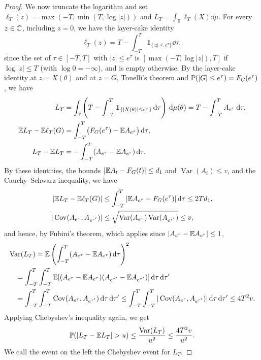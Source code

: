 \begin{proof}
We now truncate the logarithm and set
$\ell_T(z)=\max(-T,\min(T,\log|z|))$ and
$L_T=\int_{\mathbb T}\ell_T(X)\dd\mu$.
For every $z\in\mathbb C$, including $z=0$, we have the layer-cake identity
\[
 \ell_T(z)=T-\int_{-T}^T\boldsymbol1_{\{|z|\leq e^\tau\}}\dd\tau,
\]
since the set of $\tau\in[-T,T]$ with $|z|\leq e^\tau$ is
$[\max(-T,\log|z|),T]$ if $\log|z|\leq T$ (with $\log0=-\infty$), and is
empty otherwise.
By the layer-cake identity at $z=X(\theta)$ and at $z=G$, Tonelli's
theorem and $\mathbb P(|G|\leq e^\tau)=F_G(e^\tau)$, we have
\begin{align*}
 L_T
 &=\int_{\mathbb T}\left(T-\int_{-T}^T
         \boldsymbol1_{\{|X(\theta)|\leq e^\tau\}}\,\mathrm d\tau\right)\,\mathrm d\mu(\theta)
 =T-\int_{-T}^T A_{e^\tau}\,\mathrm d\tau,\\
 \mathbb E L_T-\mathbb E\ell_T(G)
 &=\int_{-T}^T\bigl(F_G(e^\tau)-\mathbb E A_{e^\tau}\bigr)\,\mathrm d\tau,\\
 L_T-\mathbb E L_T
 &=-\int_{-T}^T(A_{e^\tau}-\mathbb E A_{e^\tau})\,\mathrm d\tau.
\end{align*}
By these identities, the bounds $|\mathbb E A_t-F_G(t)|\leq d_1$ and
$\operatorname{Var}(A_t)\leq v$, and the Cauchy--Schwarz inequality, we
have
\begin{align*}
 |\mathbb E L_T-\mathbb E\ell_T(G)|
 &\leq\int_{-T}^T|\mathbb E A_{e^\tau}-F_G(e^\tau)|\,\mathrm d\tau
 \leq2Td_1,\\
 |\operatorname{Cov}(A_{e^\tau},A_{e^{\tau'}})|
 &\leq\sqrt{\operatorname{Var}(A_{e^\tau})\operatorname{Var}(A_{e^{\tau'}})}
 \leq v,
\end{align*}
and hence, by Fubini's theorem, which applies since
$|A_{e^\tau}-\mathbb E A_{e^\tau}|\leq1$,
\begin{align*}
 &\operatorname{Var}(L_T)
 =\mathbb E\left(\int_{-T}^T(A_{e^\tau}-\mathbb E A_{e^\tau})\,\mathrm d\tau\right)^2\\
 &\quad=\int_{-T}^T\int_{-T}^T
       \mathbb E[(A_{e^\tau}-\mathbb E A_{e^\tau})(A_{e^{\tau'}}-\mathbb E A_{e^{\tau'}})]
       \,\mathrm d\tau\,\mathrm d\tau'\\
 &\quad=\int_{-T}^T\int_{-T}^T
       \operatorname{Cov}(A_{e^\tau},A_{e^{\tau'}})\,\mathrm d\tau\,\mathrm d\tau'
 \leq\int_{-T}^T\int_{-T}^T
       |\operatorname{Cov}(A_{e^\tau},A_{e^{\tau'}})|\,\mathrm d\tau\,\mathrm d\tau'
 \leq4T^2v.
\end{align*}
Applying Chebyshev's inequality again, we get
\[
 \Prob(|L_T-\E L_T|>u)
 \leq\frac{\operatorname{Var}(L_T)}{u^2}
 \leq\frac{4T^2v}{u^2}.
\]
We call the event on the left the Chebyshev event for $L_T$.


\end{proof}
